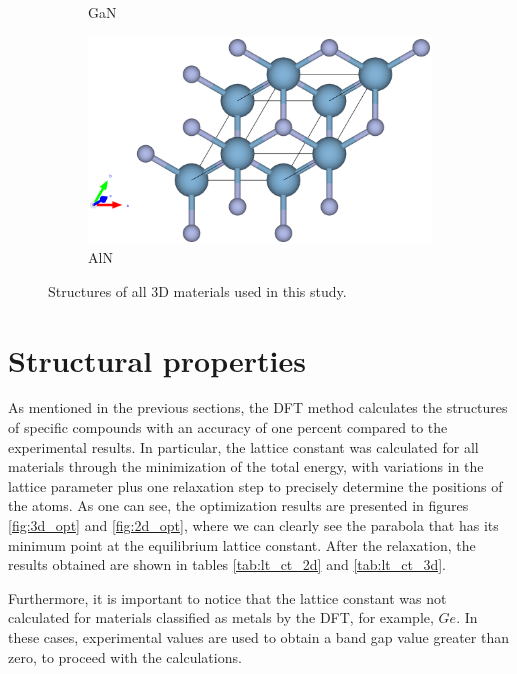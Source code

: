\begin{figure}[htb]
\begin{subfigure}{0.3\textwidth}
  \caption{GaN}
\end{subfigure}
\medskip
\begin{subfigure}{0.3\textwidth}
  \includegraphics[width=\linewidth]{images/aln_dt_3d.eps}
  \caption{AlN}
\end{subfigure}\hfil %

\medskip


\caption{Structures of all 3D materials used in this study.}
\label{fig:3d_materials_structure}
\end{figure}


\FloatBarrier
\section{Structural properties}
As mentioned in the previous sections, the DFT method calculates the structures of specific compounds with an accuracy of one percent compared to the experimental results. In particular, the lattice constant was calculated for all materials through the minimization of the total energy, with variations in the lattice parameter plus one relaxation step to precisely determine the positions of the atoms. As one can see, the optimization results are presented in figures \ref{fig:3d_opt} and \ref{fig:2d_opt}, where we can clearly see the parabola that has its minimum point at the equilibrium lattice constant. After the relaxation, the results obtained are shown in tables \ref{tab:lt_ct_2d} and \ref{tab:lt_ct_3d}.

Furthermore, it is important to notice that the lattice constant was not calculated for materials classified as metals by the DFT, for example, $Ge$. In these cases, experimental values are used to obtain a band gap value greater than zero, to proceed with the calculations.

